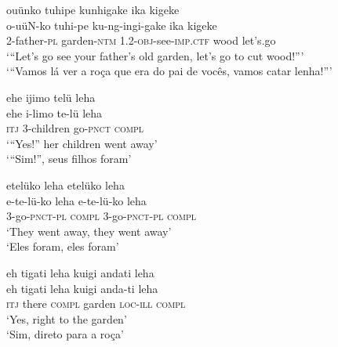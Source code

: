 \documentclass[output=paper,
modfonts,nonflat
]{langsci/langscibook}
\begin{document}
\ea ouünko tuhipe kunhigake ika kigeke \\[.3em]
\gll o-uüN-ko	tuhi-pe		ku-ng{\footnotemark}-ingi-gake	ika	kigeke	\\
2-father-\textsc{pl} 	garden-\textsc{ntm} 	1.2-\textsc{obj}-see-\textsc{imp.ctf} 		wood 	let’s.go\\
\glt ‘“Let’s go see your father’s old garden, let’s go to cut wood!”’\\
‘“Vamos lá ver a roça que era do pai de vocês, vamos catar lenha!”’\\
\z

\ea ehe ijimo telü leha\\[.3em]
\gll ehe	i-limo		te-lü		leha\\
\textsc{itj} 	3-children 	go-\textsc{pnct}	\textsc{compl} \\
\glt ‘“Yes!” her children went away’\\
‘“Sim!”, seus filhos foram’\\
\z

\ea etelüko leha etelüko leha\\[.3em]
\gll e-te-lü-ko	leha	e-te-lü-ko	leha\\
3-go-\textsc{pnct-pl} 	\textsc{compl} 3-go-\textsc{pnct-pl} 	\textsc{compl} \\
\glt ‘They went away, they went away’\\
‘Eles foram, eles foram’\\
\z

\newpage 
\ea eh tigati leha kuigi andati leha \\[.3em]
\gll eh tigati	leha	kuigi	anda-ti		leha\\ 
\textsc{itj} there 	\textsc{compl} garden 	\textsc{loc-ill} 	\textsc{compl}  \\
\glt ‘Yes, right to the garden’\\
‘Sim, direto para a roça’\\
\z
\end{document}
